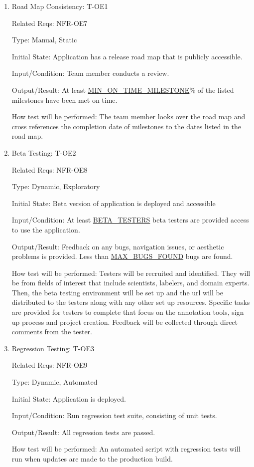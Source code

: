 \documentclass[12pt, titlepage]{article}
\begin{document}
\begin{enumerate}

\item{Road Map Consistency: T-OE1\\}

Related Reqs: NFR-OE7

Type: Manual, Static
					
Initial State: Application has a release road map that is publicly accessible.
					
Input/Condition: Team member conducts a review.
					
Output/Result: At least \hyperref[MIN_ON_TIME_MILESTONE]{MIN\_ON\_TIME\_MILESTONE}\% of the listed milestones have been met on time.
					
How test will be performed: The team member looks over the road map and cross references the completion date of milestones to the dates listed in the road map.

\item{Beta Testing: T-OE2\\}

Related Reqs: NFR-OE8

Type: Dynamic, Exploratory
					
Initial State: Beta version of application is deployed and accessible
					
Input/Condition: At least \hyperref[BETA_TESTERS]{BETA\_TESTERS} beta testers are provided access to use the application.
					
Output/Result: Feedback on any bugs, navigation issues, or aesthetic problems is provided. Less than \hyperref[MAX_BUGS_FOUND]{MAX\_BUGS\_FOUND} bugs are found.
					
How test will be performed: Testers will be recruited and identified. They will be from fields of interest that include scientists, labelers, and domain experts. Then, the beta testing environment will be set up and the url will be distributed to the testers along with any other set up resources. Specific tasks are provided for testers to complete that focus on the annotation tools, sign up process and project creation. Feedback will be collected through direct comments from the tester.

\item{Regression Testing: T-OE3\\}

Related Reqs: NFR-OE9

Type: Dynamic, Automated
					
Initial State: Application is deployed.
					
Input/Condition: Run regression test suite, consisting of unit tests.
					
Output/Result: All regression tests are passed.
					
How test will be performed: An automated script with regression tests will run when updates are made to the production build.

\end{enumerate}
\end{document}
